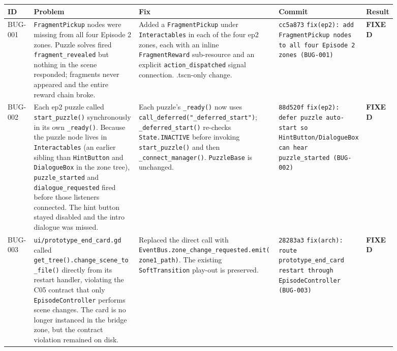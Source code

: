 \documentclass[12pt, a4paper]{article}
\newcommand{\sevFixed}{\textcolor{passgre}{\textbf{FIXED}}}
\begin{document}
\begin{center}
\begin{longtable}{p{0.06\linewidth} p{0.24\linewidth} p{0.32\linewidth} p{0.20\linewidth} p{0.07\linewidth}}
\toprule
\textbf{ID} & \textbf{Problem} & \textbf{Fix} & \textbf{Commit} & \textbf{Result} \\
\midrule
\endfirsthead
\bottomrule
\endlastfoot

BUG-001 &
\texttt{FragmentPickup} nodes were missing from all four Episode 2 zones. Puzzle solves fired \texttt{fragment\_revealed} but nothing in the scene responded; fragments never appeared and the entire reward chain broke. &
Added a \texttt{FragmentPickup} under \texttt{Interactables} in each of the four ep2 zones, each with an inline \texttt{FragmentReward} sub-resource and an explicit \texttt{action\_dispatched} signal connection. .tscn-only change. &
\texttt{cc5a873} \newline \texttt{fix(ep2): add FragmentPickup nodes to all four Episode 2 zones (BUG-001)} &
\sevFixed \\

BUG-002 &
Each ep2 puzzle called \texttt{start\_puzzle()} synchronously in its own \texttt{\_ready()}. Because the puzzle node lives in \texttt{Interactables} (an earlier sibling than \texttt{HintButton} and \texttt{DialogueBox} in the zone tree), \texttt{puzzle\_started} and \texttt{dialogue\_requested} fired before those listeners connected. The hint button stayed disabled and the intro dialogue was missed. &
Each puzzle's \texttt{\_ready()} now uses \texttt{call\_deferred("\_deferred\_start")}; \texttt{\_deferred\_start()} re-checks \texttt{State.INACTIVE} before invoking \texttt{start\_puzzle()} and then \texttt{\_connect\_manager()}. \texttt{PuzzleBase} is unchanged. &
\texttt{88d520f} \newline \texttt{fix(ep2): defer puzzle auto-start so HintButton/DialogueBox can hear puzzle\_started (BUG-002)} &
\sevFixed \\

BUG-003 &
\texttt{ui/prototype\_end\_card.gd} called \texttt{get\_tree().change\_scene\_to\_file()} directly from its restart handler, violating the C05 contract that only \texttt{EpisodeController} performs scene changes. The card is no longer instanced in the bridge zone, but the contract violation remained on disk. &
Replaced the direct call with \texttt{EventBus.zone\_change\_requested.emit(zone1\_path)}. The existing \texttt{SoftTransition} play-out is preserved. &
\texttt{28283a3} \newline \texttt{fix(arch): route prototype\_end\_card restart through EpisodeController (BUG-003)} &
\sevFixed \\


\end{longtable}
\end{center}
\end{document}
